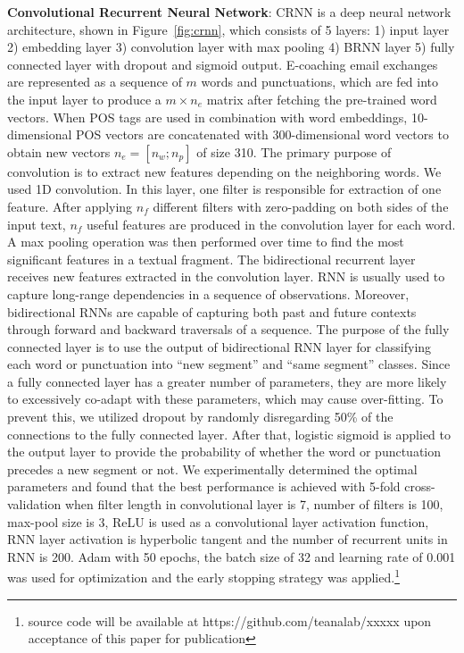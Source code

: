 \documentclass{amia}
\begin{document}
\textbf{Convolutional Recurrent Neural Network}: CRNN is a deep neural network architecture,\cite{treviso2017sentence} shown in Figure~\ref{fig:crnn}, which consists of 5 layers: 1) input layer 2) embedding layer 3) convolution layer with max pooling 4) BRNN layer 5) fully connected layer with dropout and sigmoid output. 
E-coaching email exchanges are represented as a sequence of $m$ words and punctuations, which are fed into the input layer to produce a $m \times n_e$ matrix after fetching the pre-trained word vectors. When POS tags are used in combination with word embeddings, 10-dimensional POS vectors are concatenated with 300-dimensional word vectors to obtain new vectors $n_e = [n_w;n_p]$ of size 310. The primary purpose of convolution is to extract new features depending on the neighboring words. We used 1D convolution. In this layer, one filter is responsible for extraction of one feature. After applying $n_f$ different filters with zero-padding on both sides of the input text, $n_f$ useful features are produced in the convolution layer for each word. A max pooling operation was then performed over time to find the most significant features in a textual fragment. The bidirectional recurrent layer receives new features extracted in the convolution layer. RNN is usually used to capture long-range dependencies in a sequence of observations. Moreover, bidirectional RNNs are capable of capturing both past and future contexts through forward and backward traversals of a sequence. The purpose of the fully connected layer is to use the output of bidirectional RNN layer for classifying each word or punctuation into ``new segment'' and ``same segment'' classes. Since a fully connected layer has a greater number of parameters, they are more likely to excessively co-adapt with these parameters, which may cause over-fitting. To prevent this, we utilized dropout by randomly disregarding 50\% of the connections to the fully connected layer. After that, logistic sigmoid is applied to the output layer to provide the probability of whether the word or punctuation precedes a new segment or not. We experimentally determined the optimal parameters and found that the best performance is achieved with 5-fold cross-validation when filter length in convolutional layer is 7, number of filters is 100, max-pool size is 3, ReLU is used as a convolutional layer activation function, RNN layer activation is hyperbolic tangent and the number of recurrent units in RNN is 200. Adam\cite{kingma2014adam} with 50 epochs, the batch size of 32 and learning rate of 0.001 was used for optimization and the early stopping strategy was applied.\footnote{source code will be available at https://github.com/teanalab/xxxxx upon acceptance of this paper for publication}
\end{document}
